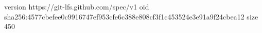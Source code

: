 version https://git-lfs.github.com/spec/v1
oid sha256:4577cbefee0c9916747ef953cfe6c388e808cf3f1c453524e3e91a9f24cbea12
size 450
